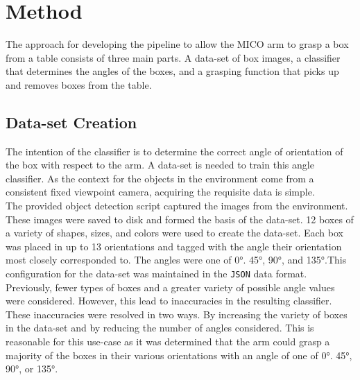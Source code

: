 \documentclass[letterpaper, 10 pt, conference]{conf/ieeeconf}  %
\begin{document}
\section{Method}

The approach for developing the pipeline to allow the MICO arm to grasp a box
from a table consists of three main parts. A data-set of box images, a
classifier that determines the angles of the boxes, and a grasping function that
picks up and removes boxes from the table.

\subsection{Data-set Creation} %

The intention of the classifier is to determine the correct angle of orientation
of the box with respect to the arm. A data-set is needed to train this angle
classifier. As the context for the objects in the environment come from a
consistent fixed viewpoint camera, acquiring the requisite data is simple.\\

The provided object detection script captured the images from the environment.
These images were saved to disk and formed the basis of the data-set. 12 boxes
of a variety of shapes, sizes, and colors were used to create the data-set. Each
box was placed in up to 13 orientations and tagged with the angle their
orientation most closely corresponded to. The angles were one of \ang{0}.
\ang{45}, \ang{90}, and \ang{135}.This configuration for the data-set was
maintained in the \texttt{JSON} data format.\\

Previously, fewer types of boxes and a greater variety of possible angle values
were considered. However, this lead to inaccuracies in the resulting classifier.
These inaccuracies were resolved in two ways. By increasing the variety of boxes
in the data-set and by reducing the number of angles considered. This is
reasonable for this use-case as it was determined that the arm could grasp a
majority of the boxes in their various orientations with an angle of one of
\ang{0}. \ang{45}, \ang{90}, or \ang{135}.\\
\end{document}

